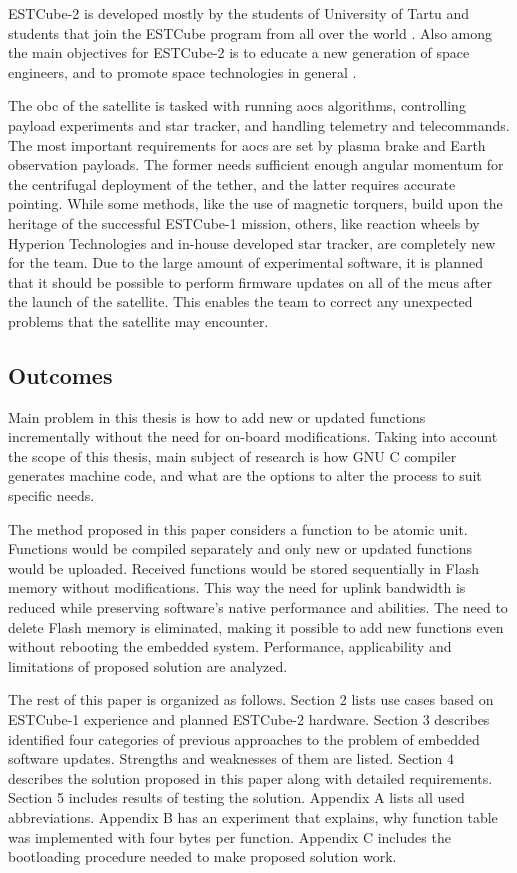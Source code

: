 ESTCube-2 is developed mostly by the students of University of Tartu and students that join the ESTCube program from all over the world \cite{Ehrpais2016}. Also among the main objectives for ESTCube-2 is to educate a new generation of space engineers, and to promote space technologies in general \cite{Iakubivskyi2016}.

The \gls{obc} of the satellite is tasked with running \gls{aocs} algorithms, controlling payload experiments and star tracker, and handling telemetry and telecommands. The most important requirements for \gls{aocs} are set by plasma brake and Earth observation payloads. The former needs sufficient enough angular momentum for the centrifugal deployment of the tether, and the latter requires accurate pointing. While some methods, like the use of magnetic torquers, build upon the heritage of the successful ESTCube-1 mission, others, like reaction wheels by Hyperion Technologies and in-house developed star tracker, are completely new for the team. Due to the large amount of experimental software, it is planned that it should be possible to perform firmware updates on all of the \glspl{mcu} after the launch of the satellite. This enables the team to correct any unexpected problems that the satellite may encounter. \cite{Ehrpais2016}


\subsection{Outcomes}

Main problem in this thesis is how to add new or updated functions incrementally without the need for on-board modifications. Taking into account the scope of this thesis, main subject of research is how GNU C compiler generates machine code, and what are the options to alter the process to suit specific needs.

The method proposed in this paper considers a function to be atomic unit. Functions would be compiled separately and only new or updated functions would be uploaded. Received functions would be stored sequentially in Flash memory without modifications. This way the need for uplink bandwidth is reduced while preserving software's native performance and abilities. The need to delete Flash memory is eliminated, making it possible to add new functions even without rebooting the embedded system. Performance, applicability and limitations of proposed solution are analyzed.

The rest of this paper is organized as follows. Section 2 lists use cases based on ESTCube-1 experience and planned ESTCube-2 hardware. Section 3 describes identified four categories of previous approaches to the problem of embedded software updates. Strengths and weaknesses of them are listed. Section 4 describes the solution proposed in this paper along with detailed requirements. Section 5 includes results of testing the solution. Appendix A lists all used abbreviations. Appendix B has an experiment that explains, why function table was implemented with four bytes per function. Appendix C includes the bootloading procedure needed to make proposed solution work.
